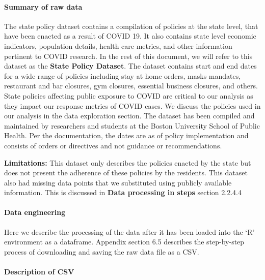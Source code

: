 \documentclass[
]{article}
\begin{document}
\hypertarget{summary-of-raw-data-3}{%
\paragraph{\texorpdfstring{Summary of raw data\\
}{Summary of raw data }}\label{summary-of-raw-data-3}}

The state policy dataset contains a compilation of policies at the state
level, that have been enacted as a result of COVID 19. It also contains
state level economic indicators, population details, health care
metrics, and other information pertinent to COVID research. In the rest
of this document, we will refer to this dataset as the \textbf{State
Policy Dataset}. The dataset contains start and end dates for a wide
range of policies including stay at home orders, masks mandates,
restaurant and bar closures, gym closures, essential business closures,
and others. State policies affecting public exposure to COVID are
critical to our analysis as they impact our response metrics of COVID
cases. We discuss the policies used in our analysis in the data
exploration section. The dataset has been compiled and maintained by
researchers and students at the Boston University School of Public
Health. Per the documentation, the dates are as of policy implementation
and consists of orders or directives and not guidance or
recommendations.

\textbf{Limitations: } This dataset only describes the policies enacted
by the state but does not present the adherence of these policies by the
residents. This dataset also had missing data points that we substituted
using publicly available information. This is discussed in \textbf{Data
processing in steps} section 2.2.4.4

\hypertarget{data-engineering-2}{%
\paragraph{\texorpdfstring{Data engineering\\
}{Data engineering }}\label{data-engineering-2}}

Here we describe the processing of the data after it has been loaded
into the `R' environment as a dataframe. Appendix section 6.5 describes
the step-by-step process of downloading and saving the raw data file as
a CSV.

\hypertarget{description-of-csv-2}{%
\paragraph{Description of CSV}\label{description-of-csv-2}}
\end{document}
